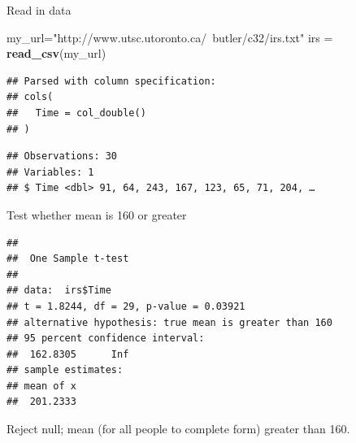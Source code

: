 \documentclass[ignorenonframetext,]{beamer}
\newenvironment{Shaded}{\begin{snugshade}}{\end{snugshade}}
\newcommand{\DataTypeTok}[1]{\textcolor[rgb]{0.13,0.29,0.53}{#1}}
\newcommand{\DecValTok}[1]{\textcolor[rgb]{0.00,0.00,0.81}{#1}}
\newcommand{\KeywordTok}[1]{\textcolor[rgb]{0.13,0.29,0.53}{\textbf{#1}}}
\newcommand{\NormalTok}[1]{#1}
\newcommand{\OperatorTok}[1]{\textcolor[rgb]{0.81,0.36,0.00}{\textbf{#1}}}
\newcommand{\StringTok}[1]{\textcolor[rgb]{0.31,0.60,0.02}{#1}}
\begin{document}
\begin{frame}[fragile]{Read in data}
\protect\hypertarget{read-in-data}{}

\begin{Shaded}
\begin{Highlighting}[]
\NormalTok{my_url=}\StringTok{"http://www.utsc.utoronto.ca/~butler/c32/irs.txt"}
\NormalTok{irs =}\StringTok{ }\KeywordTok{read_csv}\NormalTok{(my_url)}
\end{Highlighting}
\end{Shaded}

\begin{verbatim}
## Parsed with column specification:
## cols(
##   Time = col_double()
## )
\end{verbatim}

\begin{Shaded}
\end{Shaded}

\begin{verbatim}
## Observations: 30
## Variables: 1
## $ Time <dbl> 91, 64, 243, 167, 123, 65, 71, 204, …
\end{verbatim}

\end{frame}

\begin{frame}[fragile]{Test whether mean is 160 or greater}
\protect\hypertarget{test-whether-mean-is-160-or-greater}{}

\begin{Shaded}
\end{Shaded}

\begin{verbatim}
## 
##  One Sample t-test
## 
## data:  irs$Time
## t = 1.8244, df = 29, p-value = 0.03921
## alternative hypothesis: true mean is greater than 160
## 95 percent confidence interval:
##  162.8305      Inf
## sample estimates:
## mean of x 
##  201.2333
\end{verbatim}

Reject null; mean (for all people to complete form) greater than 160.

\end{frame}
\end{document}
